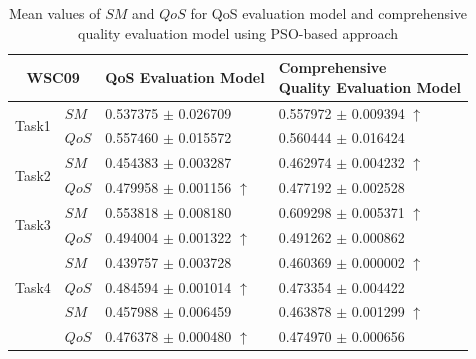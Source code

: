 \documentclass{llncs}
\begin{document}
\begin{table}[]
\footnotesize
\centering
\caption{Mean values of $SM$ and $QoS$ for QoS evaluation model and comprehensive quality evaluation model using PSO-based approach}
\label{decisionTable}
\begin{tabular}{l|l|l|l}
\hline
\multicolumn{2}{c|}{WSC09}              & QoS Evaluation Model         &\shortstack{Comprehensive \\ Quality Evaluation Model} \\ \hline
\multirow{2}{*}{Task1}  &$SM$   &0.537375 $\pm$ 0.026709               &0.557972 $\pm$ 0.009394 $\uparrow$ \\ \cline{2-4}
                        &$QoS$  &0.557460 $\pm$ 0.015572               &0.560444 $\pm$ 0.016424                          \\ \hline
\multirow{2}{*}{Task2}  &$SM$   &0.454383 $\pm$ 0.003287               &0.462974 $\pm$ 0.004232 $\uparrow$ \\ \cline{2-4} 
                        &$QoS$  &0.479958 $\pm$ 0.001156 $\uparrow$    &0.477192 $\pm$ 0.002528 \\ \hline
\multirow{2}{*}{Task3}  &$SM$   &0.553818 $\pm$ 0.008180               &0.609298 $\pm$ 0.005371 $\uparrow$   \\ \cline{2-4} 
                        &$QoS$  &0.494004 $\pm$ 0.001322 $\uparrow$    &0.491262 $\pm$ 0.000862            \\ \hline
\multirow{3}{*}{Task4}  &$SM$   &0.439757 $\pm$ 0.003728               &0.460369 $\pm$ 0.000002 $\uparrow$ \\ \cline{2-4} 
                        &$QoS$  &0.484594 $\pm$ 0.001014 $\uparrow$    &0.473354 $\pm$ 0.004422  \\ \hline
\multirow{3}{*}{Task5}  &$SM$   &0.457988 $\pm$ 0.006459               &0.463878 $\pm$ 0.001299 $\uparrow$           \\ \cline{2-4} 
                        &$QoS$  &0.476378 $\pm$ 0.000480 $\uparrow$    &0.474970 $\pm$ 0.000656  \\ \hline                                                   
\end{tabular}
\end{table}
\end{document}
